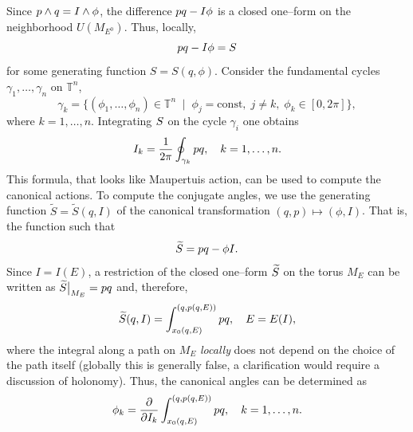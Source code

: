 \documentclass[english,fontsize=11pt,paper=a5,oneside]{scrbook}
\newcommand{\T}{\mathbb{T}}
\let\d\relax
\DeclareMathOperator{\d}{d}
\theoremstyle{definition}
\begin{document}
Since $\d p \wedge \d q = \d I \wedge \d \phi$, the difference $p\d q - I\d \phi$ is a closed one--form on the neighborhood $U(M_{E^0})$. Thus, locally,
\begin{equation}
    p\d q - I\d \phi = \d S
\end{equation}
for some generating function $S = S(q,\phi)$.
Consider the fundamental cycles $\gamma_1, \ldots, \gamma_n$ on $\T^n$,
\begin{equation}
    \gamma_k = \big\{
        (\phi_1, \ldots, \phi_n) \in \T^n \;\mid\; \phi_j = \mathrm{const}, \; j\neq k,\; \phi_k \in [0,2\pi]
        \big\},
\end{equation}
where $k=1,\ldots,n$.
Integrating $\d S$ on the cycle $\gamma_i$ one obtains
\begin{equation}
    I_k = \frac1{2\pi} \oint_{\gamma_k} p \d q, \quad k=1,\ldots,n.
\end{equation}
This formula, that looks like Maupertuis action, can be used to compute the canonical actions.
To compute the conjugate angles, we use the generating function $\widetilde S = \widetilde S(q,I)$ of the canonical transformation $(q,p) \mapsto (\phi, I)$. That is, the function such that
\begin{equation}
    \d\widetilde S = p\d q - \phi \d I.
\end{equation}
Since $I = I(E)$, a restriction of the closed one--form $\d\widetilde S$ on the torus $M_E$ can be written as $\d\widetilde S\big|_{M_E} = p\d q$ and, therefore,
\begin{equation}
    \widetilde S(q,I) = \int_{x_0(q,E)}^{(q, p(q,E))} p \d q, \quad E = E(I),
\end{equation}
where the integral along a path on $M_E$ \emph{locally} does not depend on the choice of the path itself (globally this is generally false, a clarification would require a discussion of holonomy).
Thus, the canonical angles can be determined as
\begin{equation}
    \phi_k = \frac{\partial}{\partial I_k} \int_{x_0(q,E)}^{(q, p(q,E))} p \d q, \quad k=1,\ldots,n.
\end{equation}
\end{document}
